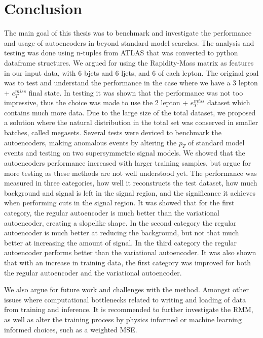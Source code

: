 \chapter{Conclusion}


The main goal of this thesis was to benchmark and investigate the performance and usage of
autoencoders in beyond standard model searches. The analysis and testing was done using 
n-tuples from ATLAS that was converted to python dataframe structures. We argued for using 
the Rapidity-Mass matrix as features in our input data, with 6 bjets and 6 ljets, and 6 
of each lepton. The original goal was to test and understand the performance in the case
where we have a 3 lepton + $e_T^{miss}$ final state. In testing it was shown that the 
performance was not too impressive, thus the choice was made to use the 2 lepton + $e_T^{miss}$ dataset which 
contains much more data. Due to the large size of the total dataset, we proposed a solution
where the natural distribution in the total set was conserved in smaller batches, called 
megasets. Several tests were deviced to benchmark the autoencoders, 
making anomalous events by altering the $p_T$ of standard model events and testing on two 
supersymmetric signal models. We showed that the autoencoders performance increased with 
larger training samples, but argue for more testing as these methods are not well 
understood yet. The performance was measured in three categories, how well it reconstructs 
the test dataset, how much background and signal is left in the signal region, and 
the significance it achieves when performing cuts in the signal region. It was showed that
for the first category, the regular autoencoder is much better than the variational autoencoder, 
creating a slopelike shape. In the second category the regular autoencoder is much better at 
reducing the background, but not that much better at increasing the amount of signal. In the 
third category the regular autoencoder performs better than the variational autoencoder. 
It was also shown that with an increase in training data, the first category was improved 
for both the regular autoencoder and the variational autoencoder. \par 
We also argue for future work and challenges with the method. Amongst other 
issues where computational bottlenecks related to writing and loading of data from training 
and inference. It is recommended to further investigate the RMM, as well as alter 
the training process by physics informed or machine learning informed choices, such as a 
weighted MSE. 
